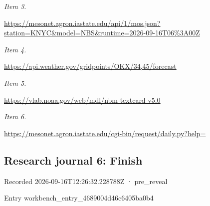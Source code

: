 \documentclass[11pt]{article}
\begin{document}
\par\noindent\textit{Item 3.}\par \href{https://mesonet.agron.iastate.edu/api/1/mos.json?station=KNYC\&model=NBS\&runtime=2026-09-16T06\%3A00Z}{https://meso\hspace{0pt}net.agron.ia\hspace{0pt}state.edu/ap\hspace{0pt}i/1/mos.json\hspace{0pt}?station=KNY\hspace{0pt}C\&model=NBS\&\hspace{0pt}runtime=2026\hspace{0pt}-09-16T06\%3A\hspace{0pt}00Z}

\par\noindent\textit{Item 4.}\par \href{https://api.weather.gov/gridpoints/OKX/34,45/forecast}{https://api.\hspace{0pt}weather.gov/\hspace{0pt}gridpoints/O\hspace{0pt}KX/34,45/for\hspace{0pt}ecast}

\par\noindent\textit{Item 5.}\par \href{https://vlab.noaa.gov/web/mdl/nbm-textcard-v5.0}{https://vlab\hspace{0pt}.noaa.gov/we\hspace{0pt}b/mdl/nbm-te\hspace{0pt}xtcard-v5.0}

\par\noindent\textit{Item 6.}\par \href{https://mesonet.agron.iastate.edu/cgi-bin/request/daily.py?help=}{https://meso\hspace{0pt}net.agron.ia\hspace{0pt}state.edu/cg\hspace{0pt}i-bin/reques\hspace{0pt}t/daily.py?h\hspace{0pt}elp=}

\subsection*{\textcolor{epdarkgreen}{Research journal 6: Finish}}
Recorded 2026-09-16T12:26:32.228788Z · pre\_reveal


Entry workbench\_en\hspace{0pt}try\_4689004d\hspace{0pt}46c6405ba0b4
\end{document}
